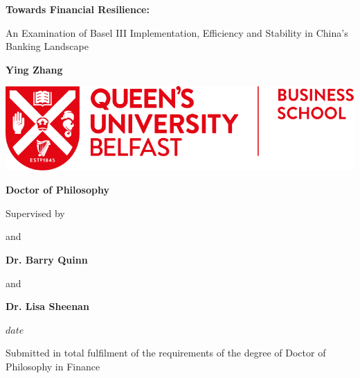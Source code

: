 \begin{center}
        \vspace*{1cm}
            
        \Huge
        \textbf{Towards Financial Resilience:}
        
        \vspace{0.3cm}
        \LARGE An Examination of Basel III Implementation, Efficiency and Stability in China's Banking Landscape
        \vspace{1cm}
            
        \textbf{Ying Zhang}
            
        \vfill
        
        \includegraphics[width=8\textwidth]{frontmatter/QBSlogo.png}
        
        \bfseries\large Doctor of Philosophy \par
        
        \vspace{1cm}
        
        \small Supervised by\par
        \vspace{0.5cm}
        \small and\par
        \bfseries\large Dr. Barry Quinn\par
        \vspace{0.4cm}
        \small and\par
        \vspace{0.4cm}
        \bfseries\large Dr. Lisa Sheenan\par
        \vspace{2cm}
        
        \bfseries\small $date$ \par
        \small Submitted in total fulfilment of the requirements of the degree of Doctor of Philosophy in Finance\par
        \vspace{0.8cm}
        
    \end{center}
